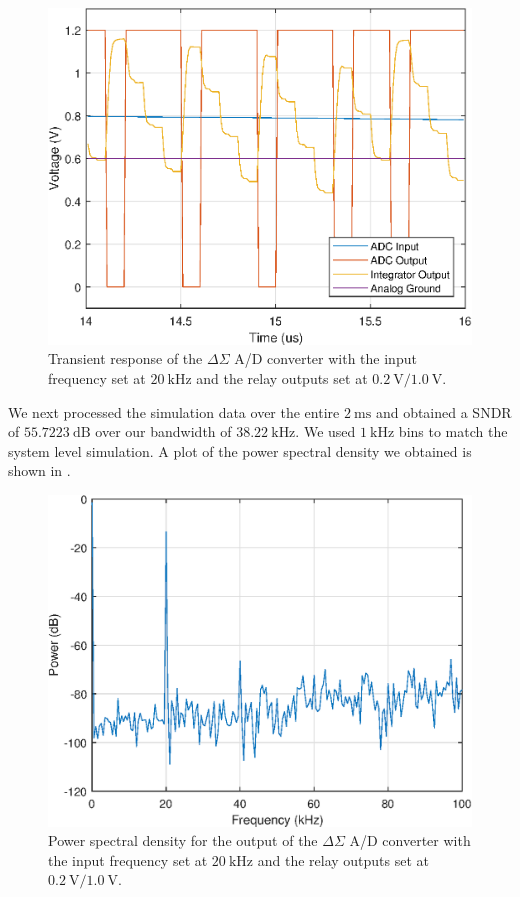 \documentclass[journal,hidelinks]{IEEEtran}
\begin{document}
\begin{figure}[!htb]
  \centering
  \includegraphics[width=0.8\columnwidth]{circuit/adc_cir_debug.eps}
  \caption{Transient response of the $\Delta \Sigma$ A/D converter with the input frequency set at $\SI{20}{\kilo\hertz}$ and the relay outputs set at $\SI{0.2}{\volt}/\SI{1.0}{\volt}$.}
  \label{fig:debug}
\end{figure}

We next processed the simulation data over the entire $\SI{2}{\milli\second}$ and obtained a SNDR of $\SI{55.7223}{\deci\bel}$ over our bandwidth of $\SI{38.22}{\kilo\hertz}$. We used $\SI{1}{\kilo\hertz}$ bins to match the system level simulation. A plot of the power spectral density we obtained is shown in .

\begin{figure}[!htb]
  \centering
  \includegraphics[width=0.8\columnwidth]{circuit/adc_cir_psd.eps}
  \caption{Power spectral density for the output of the $\Delta \Sigma$ A/D converter with the input frequency set at $\SI{20}{\kilo\hertz}$ and the relay outputs set at $\SI{0.2}{\volt}/\SI{1.0}{\volt}$.}
  \label{fig:cir_psd}
\end{figure}
\end{document}
